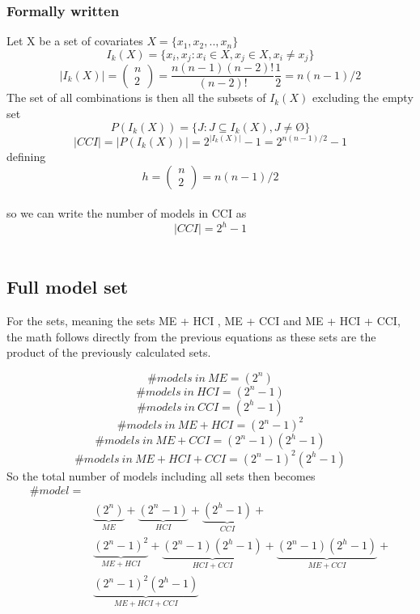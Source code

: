 \subsubsection{Formally written}
Let X be a set of covariates 
$X=\{x_1,x_2,..,x_n\}$
\[I_k\left(X\right)=\{\left.\left.x_i,x_j\right.:x_i\in X,x_j\in X,x_i\neq x_j\right.\}\] 
\[\left|I_k\left(X\right)\right|=\left( \begin{array}{c}
n \\ 
2 \end{array}
\right)=\frac{n\left(n-1\right)\left(n-2\right)!}{\left(n-2\right)!}\frac{1}{2}=n(n-1)/2\] 
The set of all combinations is then all the subsets of $I_k\left(X\right)$ excluding the empty set
\[P\left(I_k\left(X\right)\right)=\{\left.J:J\subseteq I_k\left(X\right),J\neq \textrm{\O}\right.\}\] 
\[\left|CCI\right|=\left|P\left(I_k\left(X\right)\right)\right|=2^{\left|I_k\left(X\right)\right|}-1=2^{n(n-1)/2}-1\] 
defining 
\[h=\left( \begin{array}{c}
n \\ 
2 \end{array}
\right)=n(n-1)/2\] \\
so we can write the number of models in CCI as
\[\left|CCI\right|=2^h-1\] \\

\subsection{Full model set}
For the sets, meaning the sets ME + HCI , ME + CCI and ME + HCI + CCI, the math follows directly from the previous equations as these sets are the product of the previously calculated sets. 

\[\#models\ in\ ME=\left(2^n\right)\] 
\[\#models\ in\ HCI=\left(2^n-1\right)\] 
\[\#models\ in\ CCI=\left(2^h-1\right)\] 
\[\#models\ in\ ME+HCI={\left(2^n-1\right)}^2\] 
\[\#models\ in\ ME+CCI=\left(2^n-1\right)\left(2^h-1\right)\] 
\[\#models\ in\ ME+HCI+CCI={\left(2^n-1\right)}^2\left(2^h-1\right)\] 
So the total number of models including all sets then becomes
\begin{equation*}
\begin{aligned}
\#model=\\
& \underbrace{\left(2^n\right)}_{ME}+\underbrace{\left(2^n-1\right)}_{HCI}+\underbrace{\left(2^h-1\right)}_{CCI}+\\
&\underbrace{{\left(2^n-1\right)}^2}_{ME+HCI}+\underbrace{\left(2^n-1\right)\left(2^h-1\right)}_{HCI+CCI}+\underbrace{\left(2^n-1\right)\left(2^h-1\right)}_{ME+CCI}+\\
&\underbrace{{\left(2^n-1\right)}^2\left(2^h-1\right)}_{ME+HCI+CCI} 
\end{aligned}
\end{equation*}

